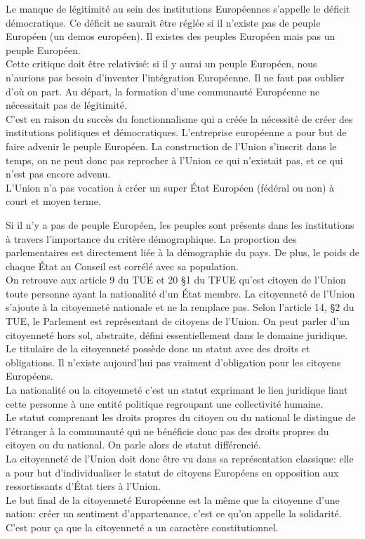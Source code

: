 \documentclass[12pt, a4paper, openany]{book}
\begin{document}
Le manque de légitimité au sein des institutions Européennes s'appelle le déficit démocratique. Ce déficit ne saurait être réglée si il n'existe pas de peuple Européen (un demos européen). Il existes des peuples Européen mais pas un peuple Européen. \\
Cette critique doit être relativisé: si il y aurai un peuple Européen, nous n'aurions pas besoin d'inventer l'intégration Européenne. Il ne faut pas oublier d'où on part. Au départ, la formation d'une communauté Européenne ne nécessitait pas de légitimité. \\
C'est en raison du succès du fonctionnalisme qui a créée la nécessité de créer des institutions politiques et démocratiques. L'entreprise européenne a pour but de faire advenir le peuple Européen. La construction de l'Union s'inscrit dans le temps, on ne peut donc pas reprocher à l'Union ce qui n'existait pas, et ce qui n'est pas encore advenu. \\
L'Union n'a pas vocation à créer un super État Européen (fédéral ou non) à court et moyen terme. 


Si il n'y a pas de peuple Européen, les peuples sont présents dans les institutions à travers l'importance du critère démographique. La proportion des parlementaires est directement liée à la démographie du pays. De plus, le poids de chaque État au Conseil est corrélé avec sa population. \\
On retrouve aux article 9 du TUE et 20 §1 du TFUE qu'est citoyen de l'Union toute personne ayant la nationalité d'un État membre. La citoyenneté de l'Union s'ajoute à la citoyenneté nationale et ne la remplace pas. Selon l'article 14, §2 du TUE, le Parlement est représentant de citoyens de l'Union. On peut parler d'un citoyenneté hors sol, abstraite, défini essentiellement dans le domaine juridique. \\
Le titulaire de la citoyenneté possède donc un statut avec des droits et obligations. Il n'existe aujourd'hui pas vraiment d'obligation pour les citoyens Européens. \\
La nationalité ou la citoyenneté c'est un statut exprimant le lien juridique liant cette personne à une entité politique regroupant une collectivité humaine. \\
Le statut comprenant les droits propres du citoyen ou du national le distingue de l'étranger à la communauté qui ne bénéficie donc pas des droits propres du citoyen ou du national. On parle alors de statut différencié. \\
La citoyenneté de l'Union doit donc être vu dans sa représentation classique: elle a pour but d'individualiser le statut de citoyens Européens en opposition aux ressortissants d'État tiers à l'Union. \\
Le but final de la citoyenneté Européenne est la même que la citoyenne d'une nation: créer un sentiment d'appartenance, c'est ce qu'on appelle la solidarité. \\
C'est pour ça que la citoyenneté a un caractère constitutionnel.
\end{document}
